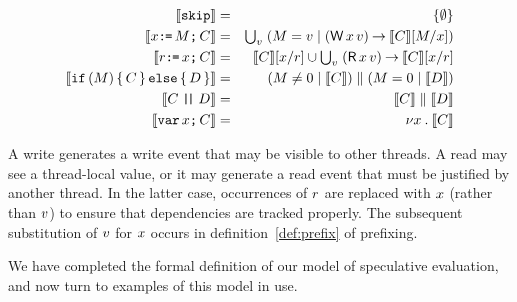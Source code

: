 \begin{definition}
  \label{def:programs}
\begin{eqnarray*}
  \sem{\SKIP} & = & \{ \emptyset \} \\
  \sem{\aLoc\GETS\aExp\SEMI \aCmd} & = & \textstyle\bigcup_\aVal\; (\aExp=\aVal \mid (\DW\aLoc\aVal) \prefix \sem{\aCmd}[\aExp/\aLoc]) \\
  \sem{\aReg\GETS\aLoc\SEMI \aCmd} & = & \sem{\aCmd}[\aLoc/\aReg] \cup \textstyle\bigcup_\aVal\; (\DR\aLoc\aVal) \prefix \sem{\aCmd}[\aLoc/\aReg] \\
  \sem{\IF (\aExp) \THEN \aCmd \ELSE \bCmd \FI} & = & (\aExp \neq 0 \mid \sem{\aCmd}) \parallel (\aExp=0 \mid \sem{\bCmd}) \\
  \sem{\aCmd \PAR \bCmd} & = & \sem{\aCmd} \parallel \sem{\bCmd} \\
  \sem{\VAR\aLoc\SEMI \aCmd} & = & \nu \aLoc \st \sem{\aCmd}
\end{eqnarray*}
\end{definition}

A write generates a write event that may be visible
to other threads.  A read may see a
thread-local value, or it may generate a read event that must be justified by
another thread.  In the latter case, occurrences of $r$ are replaced with
$x$ (rather than $v$) to ensure that dependencies are tracked
properly.  The subsequent substitution of $v$ for $x$ occurs in
definition~\ref{def:prefix} of prefixing.

We have completed the formal definition of our model of speculative
evaluation, and now turn to examples of this model in use.
